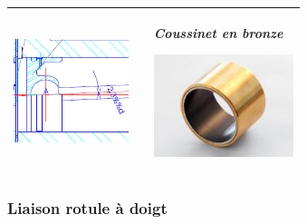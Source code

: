\documentclass[10pt,oneside]{article}
\begin{document}
\begin{center}
\begin{tabular}{p{} c p{}}
\\
\hline 
\begin{center}
\includegraphics[height=3cm]{png/ex_pivotg} 
\end{center}
&&
\begin{center}
\textit{Coussinet en bronze}

\includegraphics[height=3cm]{png/coussinet} 
\end{center}\\
\hline 
\end{tabular}
\end{center}

\subsubsection{Liaison rotule à doigt}
\end{document}
